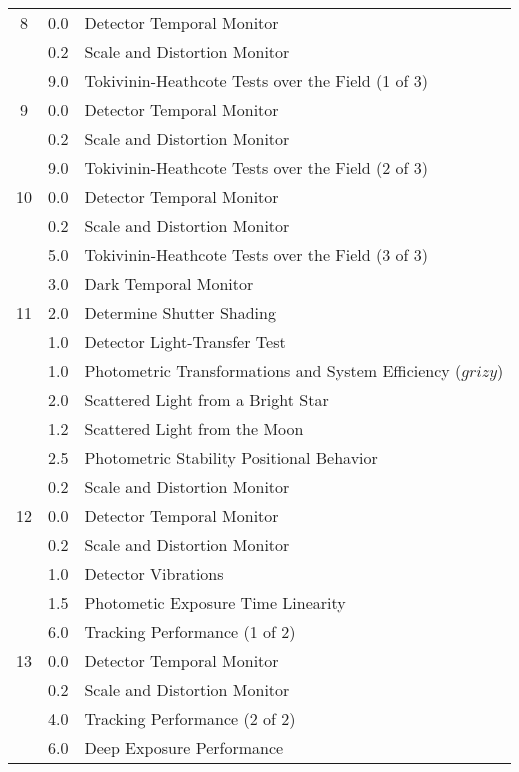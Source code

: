 \documentclass{article}
\begin{document}
\begin{table}
\begin{tabular}{crp{8cm}}
\hline
8&0.0&Detector Temporal Monitor\\
 &0.2&Scale and Distortion Monitor\\
 &9.0&Tokivinin-Heathcote Tests over the Field (1 of 3)\\
\hline
9&0.0&Detector Temporal Monitor\\
 &0.2&Scale and Distortion Monitor\\
 &9.0&Tokivinin-Heathcote Tests over the Field (2 of 3)\\
\hline
10&0.0&Detector Temporal Monitor\\
  &0.2&Scale and Distortion Monitor\\
  &5.0&Tokivinin-Heathcote Tests over the Field (3 of 3)\\
  &3.0&Dark Temporal Monitor\\
\hline
11&2.0&Determine Shutter Shading\\
  &1.0&Detector Light-Transfer Test\\
  &1.0&Photometric Transformations and System Efficiency ($grizy$)\\
  &2.0&Scattered Light from a Bright Star\\
  &1.2&Scattered Light from the Moon\\
  &2.5&Photometric Stability Positional Behavior\\
  &0.2&Scale and Distortion Monitor\\
\hline
12&0.0&Detector Temporal Monitor\\
  &0.2&Scale and Distortion Monitor\\
  &1.0&Detector Vibrations\\
  &1.5&Photometic Exposure Time Linearity\\
  &6.0&Tracking Performance (1 of 2)\\
\hline
13&0.0&Detector Temporal Monitor\\
  &0.2&Scale and Distortion Monitor\\
  &4.0&Tracking Performance (2 of 2)\\
  &6.0&Deep Exposure Performance\\
\hline
\end{tabular}
\end{table}
\end{document}
